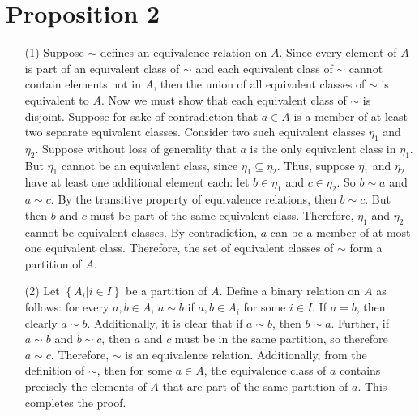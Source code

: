 \documentclass[12pt]{article}
\begin{document}
\section*{Proposition 2}
\begin{itemize}
\item[(1)] Suppose $\sim$ defines an equivalence relation on $A$. Since every element of $A$ is part of an equivalent class of $\sim$ and each equivalent class of $\sim$ cannot contain elements not in $A$, then the union of all equivalent classes of $\sim$ is equivalent to $A$. Now we must show that each equivalent class of $\sim$ is disjoint. Suppose for sake of contradiction that $a \in A$ is a member of at least two separate equivalent classes. Consider two such equivalent classes $\eta_1$ and $\eta_2$. Suppose without loss of generality that $a$ is the only equivalent class in $\eta_1$. But $\eta_1$ cannot be an equivalent class, since $\eta_1 \subseteq \eta_2$. Thus, suppose $\eta_1$ and $\eta_2$ have at least one additional element each: let $b \in \eta_1$ and $c \in \eta_2$. So $b \sim a$ and $a \sim c$. By the transitive property of equivalence relations, then $b \sim c$. But then $b$ and $c$ must be part of the same equivalent class. Therefore, $\eta_1$ and $\eta_2$ cannot be equivalent classes. By contradiction, $a$ can be a member of at most one equivalent class. Therefore, the set of equivalent classes of $\sim$ form a partition of $A$.
\item[(2)] Let $\left\lbrace A_i | i \in I \right\rbrace$ be a partition of $A$. Define a binary relation on $A$ as follows: for every $a, b \in A$, $a \sim b$ if $a, b \in A_i$ for some $i \in I$. If $a = b$, then clearly $a \sim b$. Additionally, it is clear that if $a \sim b$, then $b \sim a$. Further, if $a \sim b$ and $b \sim c$, then $a$ and $c$ must be in the same partition, so therefore $a \sim c$. Therefore, $\sim$ is an equivalence relation. Additionally, from the definition of $\sim$, then for some $a \in A$, the equivalence class of $a$ contains precisely the elements of $A$ that are part of the same partition of $a$. This completes the proof.
\end{itemize}
\end{document}
